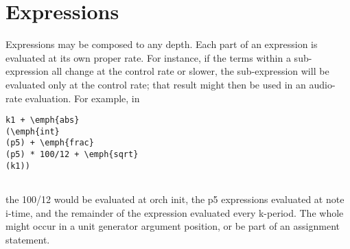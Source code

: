 \begin{comment}
\documentclass[10pt]{article}
\usepackage{fullpage, graphicx, url}
\setlength{\parskip}{1ex}
\setlength{\parindent}{0ex}
\title{Expressions}



\begin{tabular}{ccc}
The Alternative Csound Reference Manual & & \\
Previous &Syntax of the Orchestra &Next

\end{tabular}

\end{comment}
\section{Expressions}


  Expressions may be composed to any depth. Each part of an expression is evaluated at its own proper rate. For instance, if the terms within a sub-expression all change at the control rate or slower, the sub-expression will be evaluated only at the control rate; that result might then be used in an audio-rate evaluation. For example, in 


 
\begin{lstlisting}
k1 + \emph{abs}
(\emph{int}
(p5) + \emph{frac}
(p5) * 100/12 + \emph{sqrt}
(k1))
      
\end{lstlisting}


 


  the 100/12 would be evaluated at orch init, the p5 expressions evaluated at note i-time, and the remainder of the expression evaluated every k-period. The whole might occur in a unit generator argument position, or be part of an assignment statement. 


\begin{comment}
\begin{tabular}{lcr}
Previous &Home &Next \\
Constants and Variables &Up &Orchestra Header Statements

\end{tabular}



\end{comment}
